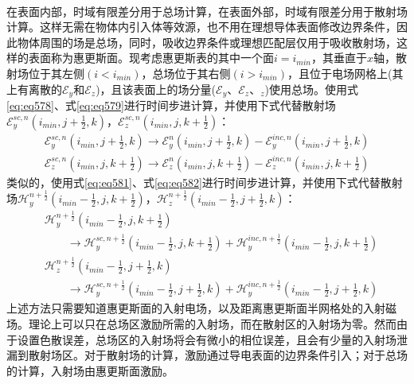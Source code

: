 \documentclass{article}
\numberwithin{equation}{section}
\begin{document}
\\
在表面内部，时域有限差分用于总场计算，在表面外部，时域有限差分用于散射场计算。这样无需在物体内引入体等效源，也不用在理想导体表面修改边界条件，因此物体周围的场是总场，同时，吸收边界条件或理想匹配层仅用于吸收散射场，这样的表面称为惠更斯面。现考虑惠更斯表的其中一个面$i=i_{min}$，其垂直于$x$轴，散射场位于其左侧$(i<i_{min})$，总场位于其右侧$(i>i_{min})$，且位于电场网格上(其上有离散的$\mathcal{E}_y$和$\mathcal{E}_z$)，且该表面上的场分量($\mathcal{E}_y$、$\mathcal{E}_z$、$\mathcal{}_z$)使用总场。使用式\ref{eq:eq578}、式\ref{eq:eq579}进行时间步进计算，并使用下式代替散射场$\mathcal{E}_y^{sc,n}\left(i_{min},j+\frac{1}{2},k\right)$，$\mathcal{E}_z^{sc,n}\left(i_{min},j,k+\frac{1}{2}\right)$：
\begin{align}
    \label{eq:eq693}
    \mathcal{E}_y^{sc,n}\left(i_{min},j+\frac{1}{2},k\right)\to\mathcal{E}_y^{n}\left(i_{min},j+\frac{1}{2},k\right)-\mathcal{E}_y^{inc,n}\left(i_{min},j+\frac{1}{2},k\right) \\
    \mathcal{E}_z^{sc,n}\left(i_{min},j,k+\frac{1}{2}\right)\to\mathcal{E}_z^{n}\left(i_{min},j,k+\frac{1}{2}\right)-\mathcal{E}_z^{inc,n}\left(i_{min},j,k+\frac{1}{2}\right)
\end{align}
类似的，使用式\ref{eq:eq581}、式\ref{eq:eq582}进行时间步进计算，并使用下式代替散射场$\mathcal{H}_y^{n+\frac{1}{2}}\left(i_{min}-\frac{1}{2},j,k+\frac{1}{2}\right)$，$\mathcal{H}_z^{n+\frac{1}{2}}\left(i_{min}-\frac{1}{2},j+\frac{1}{2},k\right)$：
\begin{align}
    \label{eq:eq694}
    &\mathcal{H}_y^{n+\frac{1}{2}}\left(i_{min}-\frac{1}{2},j,k+\frac{1}{2}\right) \nonumber \\
    &\qquad\to\mathcal{H}_y^{sc,n+\frac{1}{2}}\left(i_{min}-\frac{1}{2},j,k+\frac{1}{2}\right)+\mathcal{H}_y^{inc,n+\frac{1}{2}}\left(i_{min}-\frac{1}{2},j,k+\frac{1}{2}\right) \\
    &\mathcal{H}_z^{n+\frac{1}{2}}\left(i_{min}-\frac{1}{2},j+\frac{1}{2},k\right) \nonumber \\
    &\qquad\to\mathcal{H}_y^{sc,n+\frac{1}{2}}\left(i_{min}-\frac{1}{2},j+\frac{1}{2},k\right)+\mathcal{H}_y^{inc,n+\frac{1}{2}}\left(i_{min}-\frac{1}{2},j+\frac{1}{2},k\right)
\end{align}
上述方法只需要知道惠更斯面的入射电场，以及距离惠更斯面半网格处的入射磁场。理论上可以只在总场区激励所需的入射场，而在散射区的入射场为零。然而由于设置色散误差，总场区的入射场将会有微小的相位误差，且会有少量的入射场泄漏到散射场区。对于散射场的计算，激励通过导电表面的边界条件引入；对于总场的计算，入射场由惠更斯面激励。
\end{document}
